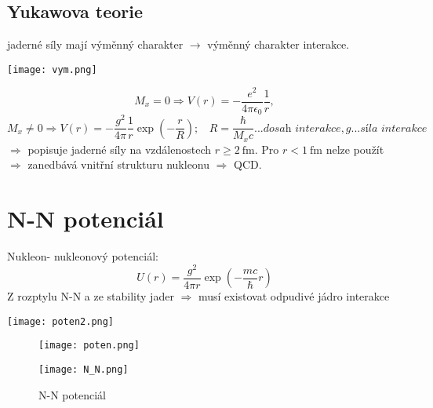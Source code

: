 \documentclass[../../main.tex]{subfiles}
\begin{document}
\subsection{Yukawova teorie}

jaderné síly mají výměnný charakter $\rightarrow$ výměnný charakter interakce. 

\begin{center}
	\texttt{[image: vym.png]}
\end{center}

\begin{equation}
M_x = 0 \Rightarrow V(r) = - \dfrac{e^2}{4 \pi \epsilon_0} \dfrac{1}{r},
\end{equation}
\begin{equation}
M_x \neq 0 \Rightarrow V(r) = - \dfrac{g^2}{4 \pi } \dfrac{1}{r} \exp(-\dfrac{r}{R}); ~~~~ R = \dfrac{\hbar}{M_x c} ... \textit{dosah interakce}, g ... \textit{síla interakce}
\end{equation}
$\Rightarrow$ popisuje jaderné síly na vzdálenostech $r \geq 2 ~\mathrm{fm}$. Pro $r < 1 ~\mathrm{fm}$ nelze použít $\Rightarrow$ zanedbává vnitřní strukturu nukleonu $\Rightarrow$ QCD.

\section{N-N potenciál}

Nukleon- nukleonový potenciál:
\begin{equation}
U(r) = \dfrac{g^2}{4 \pi r} \exp (- \dfrac{mc }{\hbar} r)
\end{equation}
Z rozptylu N-N a ze stability jader $\Rightarrow$ musí existovat odpudivé jádro interakce

\begin{center}
	\texttt{[image: poten2.png]}
\end{center}

\begin{figure}[h!]
	\begin{minipage}[c]{0.5\linewidth}
		\texttt{[image: poten.png]}
	\end{minipage}
	\hfill
	\begin{minipage}[c]{0.5\linewidth}
		\texttt{[image: N\_N.png]}
	\end{minipage}
	\caption{N-N potenciál}
\end{figure}
\end{document}
